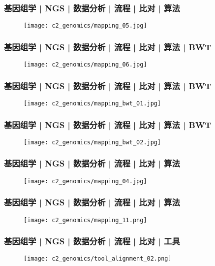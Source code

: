 \begin{frame}
  \frametitle{基因组学 | NGS | 数据分析 | 流程 | 比对 | 算法}
  \begin{figure}
    \centering
    \texttt{[image: c2\_genomics/mapping\_05.jpg]}
  \end{figure}
\end{frame}

\begin{frame}
  \frametitle{基因组学 | NGS | 数据分析 | 流程 | 比对 | 算法 | BWT}
  \begin{figure}
    \centering
    \texttt{[image: c2\_genomics/mapping\_06.jpg]}
  \end{figure}
\end{frame}

\begin{frame}
  \frametitle{基因组学 | NGS | 数据分析 | 流程 | 比对 | 算法 | BWT}
  \begin{figure}
    \centering
    \texttt{[image: c2\_genomics/mapping\_bwt\_01.jpg]}
  \end{figure}
\end{frame}

\begin{frame}
  \frametitle{基因组学 | NGS | 数据分析 | 流程 | 比对 | 算法 | BWT}
  \begin{figure}
    \centering
    \texttt{[image: c2\_genomics/mapping\_bwt\_02.jpg]}
  \end{figure}
\end{frame}

\begin{frame}
  \frametitle{基因组学 | NGS | 数据分析 | 流程 | 比对 | 算法}
  \begin{figure}
    \centering
    \texttt{[image: c2\_genomics/mapping\_04.jpg]}
  \end{figure}
\end{frame}

\begin{frame}
  \frametitle{基因组学 | NGS | 数据分析 | 流程 | 比对 | 算法}
  \begin{figure}
    \centering
    \texttt{[image: c2\_genomics/mapping\_11.png]}
  \end{figure}
\end{frame}

\begin{frame}
  \frametitle{基因组学 | NGS | 数据分析 | 流程 | 比对 | 工具}
  \begin{figure}
    \centering
    \texttt{[image: c2\_genomics/tool\_alignment\_02.png]}
  \end{figure}
\end{frame}


